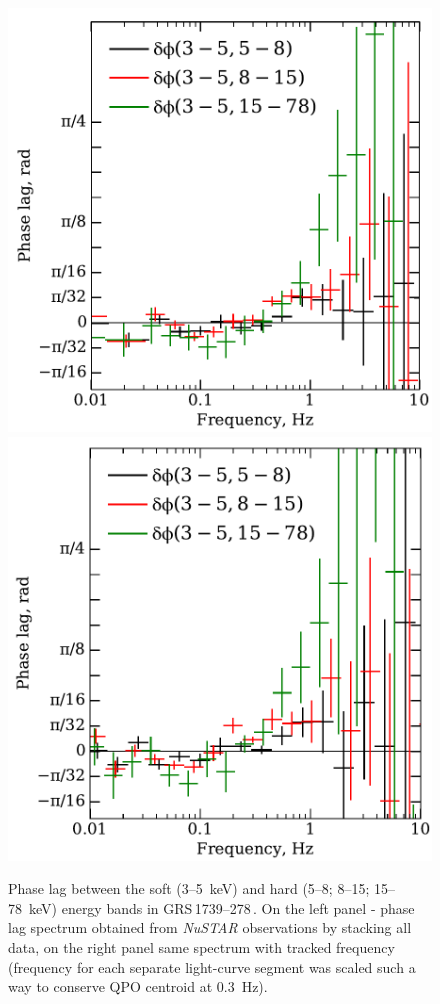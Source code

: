 \documentclass[a4paper,fleqn,usenatbib]{mnras}
\def\grs{{GRS\,1739--278\,}}
\begin{document}
\begin{figure}
        \includegraphics[width=0.99\columnwidth]{phase_lag_linear_fixed_fqpo.pdf}
        \includegraphics[width=0.99\columnwidth]{phase_lag_linear_y_traced_qpo.pdf}
        \caption{Phase lag between the soft (3--5~keV) and hard (5--8; 8--15; 15--78~keV) energy bands in \grs. 
        On the left panel - phase lag spectrum obtained from {\it NuSTAR} observations by stacking all data, on the right panel same spectrum with tracked frequency (frequency for each separate light-curve segment was scaled such a way to conserve QPO centroid at 0.3~Hz).}
        \label{fig:phase_lag}
\end{figure}
\end{document}
